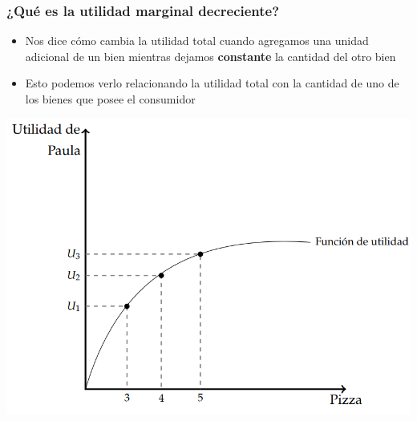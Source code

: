 \documentclass{beamer}
\begin{document}
\begin{frame}
\frametitle{¿Qué es la utilidad marginal decreciente?}
\begin{itemize}
    \item Nos dice cómo cambia la utilidad total cuando agregamos una unidad adicional de un bien mientras dejamos \textbf{constante} la cantidad del otro bien 
    \item Esto podemos verlo relacionando la utilidad total con la cantidad de uno de los bienes que posee el consumidor    
\end{itemize}     
\begin{center}
    \includegraphics[scale=0.3]{../Figures/C7.9b.png}
\end{center}
\end{frame}
\end{document}

